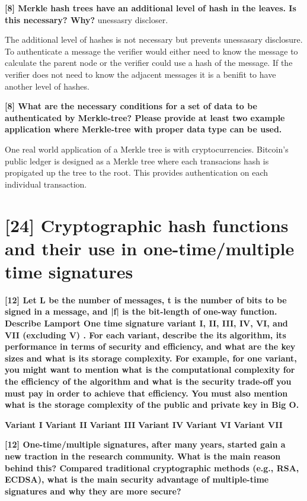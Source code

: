 \documentclass[letterpaper,11pt,notitlepage,fleqn]{article}
\begin{document}
\noindent \textbf{[8] Merkle hash trees have an additional level of hash in the leaves. Is this necessary? Why?}
unessasry discloser.

The additional level of hashes is not necessary but prevents unessasary disclosure. To authenticate a message the verifier would either need to know the message to calculate the parent node or the verifier could use a hash of the message. If the verifier does not need to know the adjacent messages it is a benifit to have another level of hashes. 

\noindent \textbf{[8] What are the necessary conditions for a set of data to be authenticated by Merkle-tree? Please provide at least two example application where Merkle-tree with proper data type can be used.}

One real world application of a Merkle tree is with cryptocurrencies. Bitcoin's public ledger is designed as a Merkle tree where each transacions hash is propigated up the tree to the root. This provides authentication on each individual transaction.

\section{[24] Cryptographic hash functions and their use in one-time/multiple time signatures}

\noindent \textbf{[12] Let L be the number of messages, t is the number of bits to be signed in a message, and |f| is the bit-length of one-way function. Describe Lamport One time signature variant I, II, III, IV, VI, and VII (excluding V) . For each variant, describe the its algorithm, its performance in terms of security and efficiency,  and what are the key sizes and what is its storage complexity. For example, for one variant, you might want to mention what is the computational complexity for the
efficiency  of the algorithm and what is the security trade-off you must pay in order to achieve that efficiency. You must also mention what is the storage complexity of the public and private key in Big O.} 

\textbf{Variant I}
\textbf{Variant II}
\textbf{Variant III}
\textbf{Variant IV}
\textbf{Variant VI}
\textbf{Variant VII}
 

\noindent \textbf{[12] One-time/multiple signatures, after many years, started gain a new traction in  the  research  community.  What  is  the  main  reason  behind  this?  Compared traditional cryptographic methods  (e.g., RSA, ECDSA), what  is  the main security advantage of multiple-time signatures and why they are more secure?}  
\end{document}
